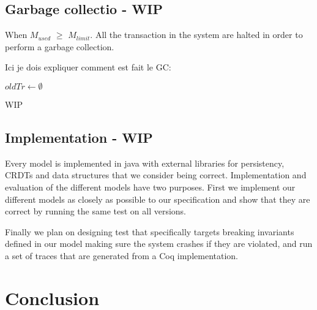 \documentclass[systeme,french,english]{compas2022}
\begin{document}
\subsection{Garbage collectio - WIP}
When \emph{$M_{used}$} $\geq$ \emph{$M_{limit}$}. 
All the transaction in the system are halted in order to perform a garbage collection.

Ici je dois expliquer comment est fait le GC:\\
\begin{algorithm}
  \(oldTr \longleftarrow \emptyset\)\;
\end{algorithm}

WIP


\subsection{Implementation - WIP}

Every model is implemented in java with external libraries for persistency, CRDTs and data structures that we consider being correct.
Implementation and evaluation of the different models have two purposes.
First we implement our different models as closely as possible to our specification and show that they are correct by running the same test on all versions.

Finally we plan on designing test that specifically targets breaking invariants defined in our model making sure the system crashes if they are violated, and run a set of traces that are generated from a Coq implementation.



\section{Conclusion}


\end{document}
